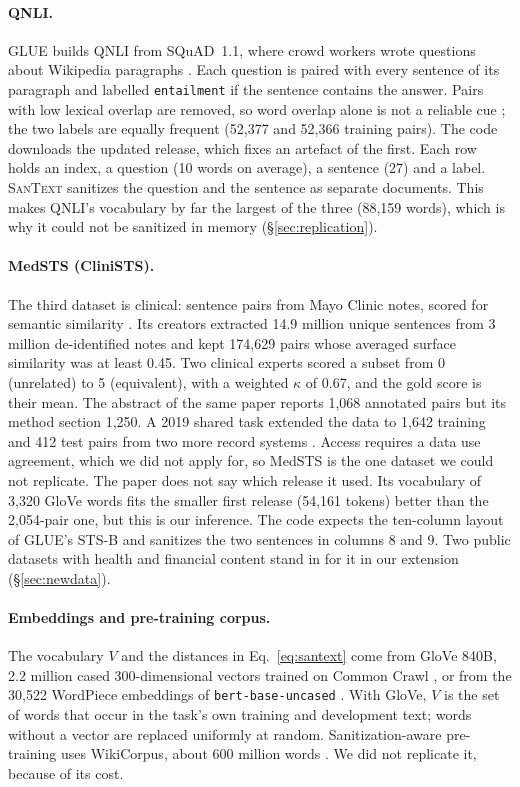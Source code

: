 \documentclass[11pt]{article}
\newcommand{\santext}{\textsc{SanText}}
\begin{document}
\paragraph{QNLI.} GLUE builds QNLI from SQuAD~1.1, where crowd workers wrote questions about Wikipedia paragraphs \citep{rajpurkar-etal-2016-squad}. Each question is paired with every sentence of its paragraph and labelled \texttt{entailment} if the sentence contains the answer. Pairs with low lexical overlap are removed, so word overlap alone is not a reliable cue \citep{wang2019glue}; the two labels are equally frequent (52,377 and 52,366 training pairs). The code downloads the updated release, which fixes an artefact of the first. Each row holds an index, a question (10 words on average), a sentence (27) and a label. \santext{} sanitizes the question and the sentence as separate documents. This makes QNLI's vocabulary by far the largest of the three (88,159 words), which is why it could not be sanitized in memory (§\ref{sec:replication}).

\paragraph{MedSTS (CliniSTS).} The third dataset is clinical: sentence pairs from Mayo Clinic notes, scored for semantic similarity \citep{wang2020medsts}. Its creators extracted 14.9 million unique sentences from 3 million de-identified notes and kept 174,629 pairs whose averaged surface similarity was at least 0.45. Two clinical experts scored a subset from 0 (unrelated) to 5 (equivalent), with a weighted $\kappa$ of 0.67, and the gold score is their mean. The abstract of the same paper reports 1,068 annotated pairs but its method section 1,250. A 2019 shared task extended the data to 1,642 training and 412 test pairs from two more record systems \citep{wang2020n2c2}. Access requires a data use agreement, which we did not apply for, so MedSTS is the one dataset we could not replicate. The paper does not say which release it used. Its vocabulary of 3,320 GloVe words fits the smaller first release (54,161 tokens) better than the 2,054-pair one, but this is our inference. The code expects the ten-column layout of GLUE's STS-B and sanitizes the two sentences in columns 8 and 9. Two public datasets with health and financial content stand in for it in our extension (§\ref{sec:newdata}).

\paragraph{Embeddings and pre-training corpus.} The vocabulary $V$ and the distances in Eq.~\ref{eq:santext} come from GloVe 840B, 2.2 million cased 300-dimensional vectors trained on Common Crawl \citep{pennington-etal-2014-glove}, or from the 30,522 WordPiece embeddings of \texttt{bert-base-uncased} \citep{devlin-etal-2019-bert}. With GloVe, $V$ is the set of words that occur in the task's own training and development text; words without a vector are replaced uniformly at random. Sanitization-aware pre-training uses WikiCorpus, about 600 million words \citep{reese2010wikicorpus}. We did not replicate it, because of its cost.
\end{document}
